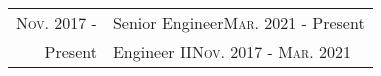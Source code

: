 \documentclass[letterpaper,10pt]{article}
\begin{document}
\begin{tabular}{R|p{6.2in}}
	\textsc{Nov.} 2017 -           & Senior Engineer\hfill\small{\textsc{Mar.} 2021 - Present}                                                                                                                                                                                                                                                                                                                                                                                                                                                                                                                                                                                                                                                                                                                                                                                                                                                                                                                                                                                                                                                                                                                                                                                         \\
	Present\phantom{ -}            & Engineer II\hfill\small{\textsc{Nov.} 2017 - \textsc{Mar.} 2021}                                                                                                                                                                                                                                                                                                                                                                                                                                                                                                                                                                                                                                                                                                                                                                                                                                                                                                                                                                                                                                                                                                                                                                                  \\

\end{tabular}
\end{document}

